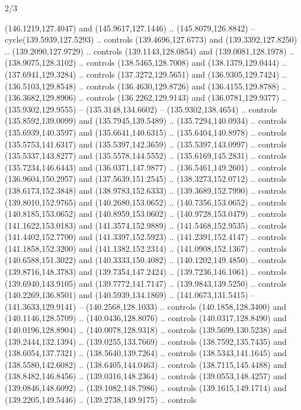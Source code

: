 \begin{flagdescription}{2/3}
\begin{scope}[shift={(0.5\flaglength,0.5)},scale=\flagwidth/320]
\begin{scope}[y=0.8pt, x=0.8pt, yscale=-1,shift={(-118.3,-146)}]
  (146.1219,127.4047) and (145.9617,127.1446) .. (145.8079,126.8842) --
  cycle(139.5939,127.5293) .. controls (139.4696,127.6773) and
  (139.3392,127.8250) .. (139.2090,127.9729) .. controls (139.1143,128.0854) and
  (139.0081,128.1978) .. (138.9075,128.3102) .. controls (138.5465,128.7008) and
  (138.1379,129.0444) .. (137.6941,129.3284) .. controls (137.3272,129.5651) and
  (136.9305,129.7424) .. (136.5103,129.8548) .. controls (136.4630,129.8726) and
  (136.4155,129.8788) .. (136.3682,129.8906) .. controls (136.2262,129.9143) and
  (136.0781,129.9377) .. (135.9302,129.9555) -- (135.3148,134.6602) --
  (135.9302,138.4654) .. controls (135.8592,139.0099) and (135.7945,139.5489) ..
  (135.7294,140.0934) .. controls (135.6939,140.3597) and (135.6641,140.6315) ..
  (135.6404,140.8978) .. controls (135.5753,141.6317) and (135.5397,142.3659) ..
  (135.5397,143.0997) .. controls (135.5337,143.8277) and (135.5578,144.5552) ..
  (135.6169,145.2831) .. controls (135.7234,146.6443) and (136.0371,147.9877) ..
  (136.5461,149.2601) .. controls (136.9604,150.2957) and (137.5639,151.2545) ..
  (138.3273,152.0712) .. controls (138.6173,152.3848) and (138.9783,152.6333) ..
  (139.3689,152.7990) .. controls (139.8010,152.9765) and (140.2680,153.0652) ..
  (140.7356,153.0652) .. controls (140.8185,153.0652) and (140.8959,153.0602) ..
  (140.9728,153.0479) .. controls (141.1622,153.0183) and (141.3574,152.9889) ..
  (141.5468,152.9535) .. controls (141.4402,152.7700) and (141.3397,152.5923) ..
  (141.2391,152.4147) .. controls (141.1858,152.3200) and (141.1382,152.2314) ..
  (141.0908,152.1367) .. controls (140.6588,151.3022) and (140.3333,150.4082) ..
  (140.1202,149.4850) .. controls (139.8716,148.3783) and (139.7354,147.2424) ..
  (139.7236,146.1061) .. controls (139.6940,143.9105) and (139.7772,141.7147) ..
  (139.9843,139.5250) .. controls (140.2269,136.8501) and (140.5939,134.1869) ..
  (141.0673,131.5415) -- (141.3633,129.9141) -- (140.2568,128.1033) .. controls
  (140.1858,128.3400) and (140.1146,128.5709) .. (140.0436,128.8076) .. controls
  (140.0317,128.8490) and (140.0196,128.8904) .. (140.0078,128.9318) .. controls
  (139.5699,130.5238) and (139.2444,132.1394) .. (139.0255,133.7669) .. controls
  (138.7592,135.7435) and (138.6054,137.7321) .. (138.5640,139.7264) .. controls
  (138.5343,141.1645) and (138.5580,142.6082) .. (138.6405,144.0463) .. controls
  (138.7115,145.4488) and (138.8482,146.8456) .. (139.0316,148.2364) .. controls
  (139.0553,148.4257) and (139.0846,148.6092) .. (139.1082,148.7986) .. controls
  (139.1615,149.1714) and (139.2205,149.5446) .. (139.2738,149.9175) .. controls

\end{scope}
\end{scope}
\end{flagdescription}
